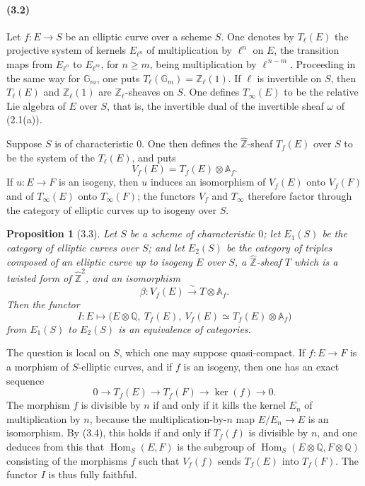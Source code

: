 \documentclass[10pt]{article}
\newcommand{\Af}{\mathbb A_f}
\newcommand{\Q}{\mathbb Q}
\newcommand{\Z}{\mathbb Z}
\newcommand{\bZ}{\widehat{\mathbb Z}}
\newcommand{\Gm}{\mathbb G_m}
\newcommand{\Hom}{\operatorname{Hom}}
\newtheorem*{proposition}{Proposition}
\begin{document}
\paragraph{(3.2)}
Let $f:E\to S$ be an elliptic curve over a scheme $S$. One denotes by $T_\ell(E)$ the
projective system of kernels $E_{\ell^n}$ of multiplication by $\ell^n$ on $E$, the transition
maps from $E_{\ell^n}$ to $E_{\ell^m}$, for $n\ge m$, being multiplication by $\ell^{\,n-m}$.
Proceeding in the same way for $\Gm$, one puts $T_\ell(\Gm)=\Z_\ell(1)$. If $\ell$ is
invertible on $S$, then $T_\ell(E)$ and $\Z_\ell(1)$ are $\Z_\ell$-sheaves on $S$. One
defines $T_\infty(E)$ to be the relative Lie algebra of $E$ over $S$, that is, the invertible
dual of the invertible sheaf $\omega$ of (2.1(a)).

Suppose $S$ is of characteristic $0$. One then defines the $\bZ$-sheaf $T_f(E)$ over $S$
to be the system of the $T_\ell(E)$, and puts
\[
V_f(E)=T_f(E)\otimes \Af.
\]
If $u:E\to F$ is an isogeny, then $u$ induces an isomorphism of $V_f(E)$ onto $V_f(F)$
and of $T_\infty(E)$ onto $T_\infty(F)$; the functors $V_f$ and $T_\infty$ therefore
factor through the category of elliptic curves up to isogeny over $S$.

\begin{proposition}[3.3]
Let $S$ be a scheme of characteristic $0$; let $E_1(S)$ be the category of elliptic curves
over $S$; and let $E_2(S)$ be the category of triples composed of an elliptic curve up to
isogeny $E$ over $S$, a $\bZ$-sheaf $T$ which is a twisted form of $\bZ^2$, and an
isomorphism
\[
\beta:V_f(E)\xrightarrow{\sim}T\otimes\Af.
\]
Then the functor
\[
I:E\longmapsto \bigl(E\otimes\Q,\ T_f(E),\ V_f(E)\simeq T_f(E)\otimes\Af\bigr)
\]
from $E_1(S)$ to $E_2(S)$ is an equivalence of categories.
\end{proposition}

The question is local on $S$, which one may suppose quasi-compact. If $f:E\to F$ is a
morphism of $S$-elliptic curves, and if $f$ is an isogeny, then one has an exact sequence
\[
0\to T_f(E)\to T_f(F)\to \ker(f)\to 0.
\tag{3.4}
\]
The morphism $f$ is divisible by $n$ if and only if it kills the kernel $E_n$ of multiplication
by $n$, because the multiplication-by-$n$ map $E/E_n\to E$ is an isomorphism. By (3.4),
this holds if and only if $T_f(f)$ is divisible by $n$, and one deduces from this that
$\Hom_S(E,F)$ is the subgroup of $\Hom_S(E\otimes\Q,F\otimes\Q)$ consisting of the
morphisms $f$ such that $V_f(f)$ sends $T_f(E)$ into $T_f(F)$. The functor $I$ is thus
fully faithful.
\end{document}
